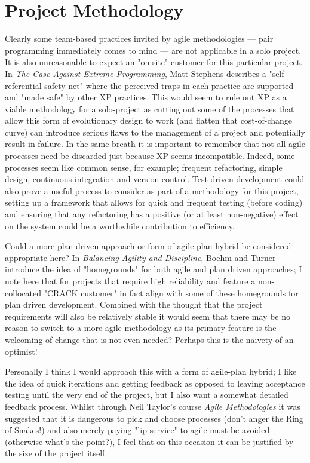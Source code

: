 \section{Project Methodology}
Clearly some team-based practices invited by agile methodologies ---
pair programming immediately comes to mind --- are not applicable in a solo
project. It is also unreasonable to expect an "on-site" customer for this
particular project. In \textit{The Case Against Extreme Programming}, Matt Stephens
describes a "self referential safety net" where the perceived traps in each
practice are supported and "made safe" by other XP practices.  This would seem
to rule out XP as a viable methodology for a solo-project as cutting out some
of the processes that allow this form of evolutionary design to work (and
flatten that cost-of-change curve) can introduce serious flaws to the
management of a project and potentially result in failure. In the same breath
it is important to remember that not all agile processes need be discarded just
because XP seems incompatible. Indeed, some processes seem like common sense,
for example; frequent refactoring, simple design, continuous integration and
version control. Test driven development could also prove a useful process to
consider as part of a methodology for this project, setting up a framework that
allows for quick and frequent testing (before coding) and ensuring that any
refactoring has a positive (or at least non-negative) effect on the system
could be a worthwhile contribution to efficiency.

Could a more plan driven approach or form of agile-plan hybrid be considered
appropriate here? In \textit{Balancing Agility and Discipline}, Boehm
and Turner introduce the idea of "homegrounds" for both agile and plan driven
approaches; I note here that for projects that require high reliability and
feature a non-collocated "CRACK customer" in fact align with some of these
homegrounds for plan driven development. Combined with the thought that the
project requirements will also be relatively stable it would seem that there
may be no reason to switch to a more agile methodology as its primary feature
is the welcoming of change that is not even needed? Perhaps this is the naivety
of an optimist!

Personally I think I would approach this with a form of agile-plan hybrid; I
like the idea of quick iterations and getting feedback as opposed to leaving
acceptance testing until the very end of the project, but I also want a somewhat
detailed feedback process. Whilst through Neil Taylor's course \textit{Agile
Methodologies} it was suggested that it is dangerous to pick and choose
processes (don’t anger the Ring of Snakes!) and also merely paying "lip service"
to agile must be avoided (otherwise what's the point?), I feel that on this
occasion it can be justified by the size of the project itself.

